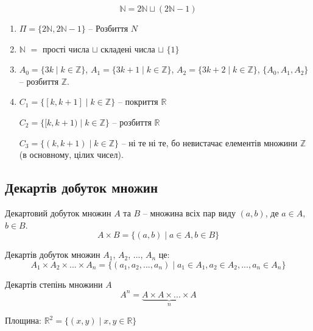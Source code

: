 \begin{example}
    $$\mathbb{N} = 2\mathbb{N} \sqcup (2\mathbb{N} - 1)$$
    \begin{enumerate}
        \item $\Pi = \{2\mathbb{N}, 2\mathbb{N} - 1\}$ -- Розбиття $N$
        \item $\mathbb{N}$ $=$ прості числа $\sqcup$ складені числа $\sqcup$ $\{1\}$
        \item $A_0 = \{3k \mid k \in \mathbb{Z}\}$, $A_1 = \{3k + 1 \mid k \in \mathbb{Z}\}$,
            $A_2 = \{3k + 2 \mid k \in \mathbb{Z}\}$, $\{A_0, A_1, A_2\}$ -- розбиття
            $\mathbb{Z}$.
        \item $C_1 = \{[k, k+1] \mid k \in \mathbb{Z}\}$ -- покриття $\mathbb{R}$\par
            $C_2 = \{[k, k+1) \mid k \in \mathbb{Z}\}$ -- розбиття $\mathbb{R}$\par
            $C_3 = \{(k, k+1) \mid k \in \mathbb{Z}\}$ -- ні те ні те, бо невистачає елементів множини $\mathbb{Z}$ (в основному, цілих чисел).
    \end{enumerate}
\end{example}

\subsection{Декартів добуток множин}

\begin{definition}
    Декартовий добуток множин $A$ та $B$ -- множина всіх пар виду $(a, b)$, де $a \in A$, $b \in B$.
    $$A \times B = \{(a, b) \mid a \in A, b \in B\}$$
\end{definition}

\begin{definition}
    Декартів добуток множин $A_1$, $A_2$, ..., $A_n$ це:
    $$A_1 \times A_2 \times ... \times A_n
    = \{(a_1, a_2, ..., a_n) \mid a_1 \in A_1, a_2 \in A_2, ..., a_n \in A_n\}$$
\end{definition}

\begin{definition}
    Декартів степінь множини $A$
    $$A^n = \underbrace{A \times A \times ... \times A}_{n}$$
\end{definition}

\begin{example}
    Площина: $\mathbb{R}^2 = \{(x, y) \mid x, y \in \mathbb{R}\}$ 
\end{example}

